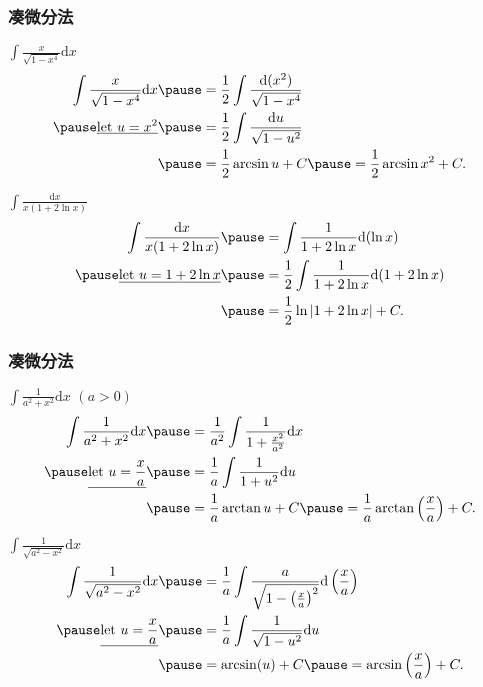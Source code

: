 \documentclass[
10pt,
aspectratio=43,
]{beamer}
\begin{document}
\begin{frame}
	\frametitle{凑微分法}
	\everymath{\displaystyle}
	{\small
		\begin{exampleblock}{$\int \frac{x}{\sqrt{1-x^4}} \mathrm{d}x$}
			$$
				\begin{aligned}
					\int \frac{x}{\sqrt{1-x^4}} \mathrm{d}x & \pause= \frac{1}{2} \int \frac{\mathrm{d}(x^2)}{\sqrt{1-x^4}} \\
					\pause\underline{\text{let }u=x^2}            & \pause=  \frac{1}{2} \int \frac{\mathrm{d}u}{\sqrt{1-u^2}}    \\
					                                        & \pause= \frac{1}{2} \arcsin u+C \pause= \frac{1}{2} \arcsin x^2+C.
				\end{aligned}
			$$
		\end{exampleblock}
		\pause
		\begin{exampleblock}{$\int \frac{\mathrm{d}x}{x(1+2 \ln x)}$}
			$$
				\begin{aligned}
					\int \frac{\mathrm{d}x}{x(1+2 \ln x)} & \pause= \int \frac{1}{1+2 \ln x} \mathrm{d}(\ln x)                  \\
					\pause\underline{\text{let }u=1+2 \ln x}    & \pause=  \frac{1}{2} \int \frac{1}{1+2 \ln x} \mathrm{d}(1+2 \ln x) \\
					                                      & \pause= \frac{1}{2} \ln |1+2 \ln x|+C.
				\end{aligned}
			$$
		\end{exampleblock}
	}
\end{frame}


\begin{frame}
	\frametitle{凑微分法}
	\everymath{\displaystyle}
	{\small
	\begin{exampleblock}{$\int \frac{1}{a^2+x^2} \mathrm{d}x\,\,(a>0)$}
		$$
		\begin{aligned}
			\int \frac{1}{a^2+x^2} \mathrm{d}x   & \pause = \frac{1}{a^2} \int \frac{1}{1+\frac{x^2}{a^2}} \mathrm{d}x   \\
			\pause\underline{\text{let }u=\frac{x}{a}} & \pause =  \frac{1}{a} \int \frac{1}{1+u^2} \mathrm{d}u          \\
												 & \pause = \frac{1}{a} \arctan u+C \pause = \frac{1}{a} \arctan\left(\frac{x}{a}\right)+C.
		\end{aligned}
		$$
	\end{exampleblock}
	\pause
	\begin{exampleblock}{$\int \frac{1}{\sqrt{a^2-x^2}} \mathrm{d}x$}
		$$
		\begin{aligned}
			\int \frac{1}{\sqrt{a^2-x^2}} \mathrm{d}x   & \pause = \frac{1}{a} \int \frac{a}{\sqrt{1-\left(\frac{x}{a}\right)^2}} \mathrm{d}\left(\frac{x}{a}\right)   \\
			\pause\underline{\text{let }u=\frac{x}{a}} & \pause =  \frac{1}{a} \int \frac{1}{\sqrt{1-u^2}} \mathrm{d}u          \\
												 & \pause = \arcsin(u)+C \pause = \arcsin\left(\frac{x}{a}\right)+C.
		\end{aligned}
		$$
	\end{exampleblock}
	}
\end{frame}
\end{document}
